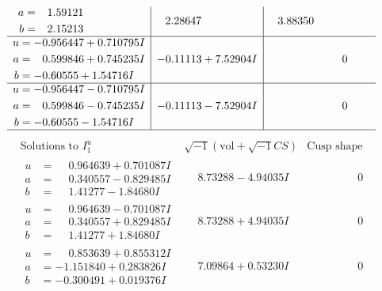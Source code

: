 \documentclass[1p]{elsarticle_modified}
\theoremstyle{definition}
\newcommand{\I}{\sqrt{-1}}
\begin{document}
$$\begin{array}{c|c|c}
\begin{aligned}
a &= \phantom{-}1.59121\phantom{ +0.000000I} \\
b &= \phantom{-}2.15213\phantom{ +0.000000I}\end{aligned}
 & \phantom{-}2.28647\phantom{ +0.000000I} & \phantom{-}3.88350\phantom{ +0.000000I} \\ \hline\begin{aligned}
u &= -0.956447 + 0.710795 I \\
a &= \phantom{-}0.599846 + 0.745235 I \\
b &= -0.60555 + 1.54716 I\end{aligned}
 & -0.11113 + 7.52904 I & \phantom{-0.000000 } 0 \\ \hline\begin{aligned}
u &= -0.956447 - 0.710795 I \\
a &= \phantom{-}0.599846 - 0.745235 I \\
b &= -0.60555 - 1.54716 I\end{aligned}
 & -0.11113 - 7.52904 I & \phantom{-0.000000 } 0\\
 \hline 
 \end{array}$$\newpage$$\begin{array}{c|c|c}  
\text{Solutions to }I^u_{1}& \I (\text{vol} + \sqrt{-1}CS) & \text{Cusp shape}\\
 \hline 
\begin{aligned}
u &= \phantom{-}0.964639 + 0.701087 I \\
a &= \phantom{-}0.340557 - 0.829485 I \\
b &= \phantom{-}1.41277 - 1.84680 I\end{aligned}
 & \phantom{-}8.73288 - 4.94035 I & \phantom{-0.000000 } 0 \\ \hline\begin{aligned}
u &= \phantom{-}0.964639 - 0.701087 I \\
a &= \phantom{-}0.340557 + 0.829485 I \\
b &= \phantom{-}1.41277 + 1.84680 I\end{aligned}
 & \phantom{-}8.73288 + 4.94035 I & \phantom{-0.000000 } 0 \\ \hline\begin{aligned}
u &= \phantom{-}0.853639 + 0.855312 I \\
a &= -1.151840 + 0.283826 I \\
b &= -0.300491 + 0.019376 I\end{aligned}
 & \phantom{-}7.09864 + 0.53230 I & \phantom{-0.000000 } 0 \\ \hline\begin{aligned}

\end{aligned}
\end{array}$$
\end{document}
